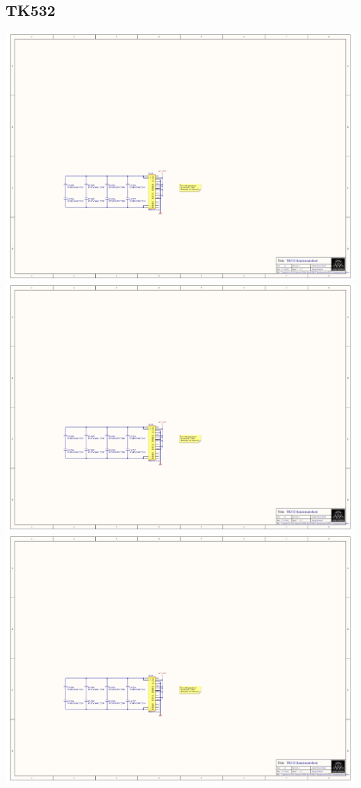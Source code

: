 \subsection{TK532}
\includegraphics[page=4,height=\textheight,width=\textwidth,keepaspectratio]{TK532_Kondensatorkort.PDF}
\includegraphics[page=5,height=\textheight,width=\textwidth,keepaspectratio]{TK532_Kondensatorkort.PDF}
\includegraphics[page=6,height=\textheight,width=\textwidth,keepaspectratio]{TK532_Kondensatorkort.PDF}
